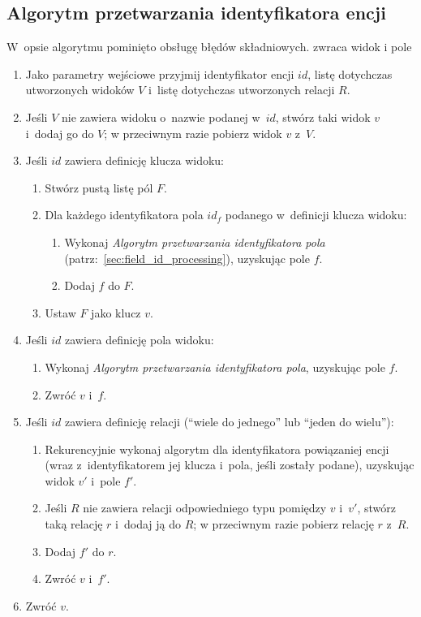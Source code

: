 \subsection{Algorytm przetwarzania identyfikatora encji} \label{sec:entity_id_processing}

W~opsie algorytmu pominięto obsługę błędów składniowych.
zwraca widok i pole

\begin{enumerate}
 \item Jako parametry wejściowe przyjmij identyfikator encji $id$, listę dotychczas utworzonych widoków $V$ i~listę dotychczas utworzonych relacji $R$.
 \item Jeśli $V$ nie zawiera widoku o~nazwie podanej w~$id$, stwórz taki widok $v$ i~dodaj go do $V$; w przeciwnym razie pobierz widok $v$ z~$V$.
 \item Jeśli $id$ zawiera definicję klucza widoku:
  \begin{enumerate}
   \item Stwórz pustą listę pól $F$.
   \item Dla każdego identyfikatora pola $id_f$ podanego w~definicji klucza widoku:
    \begin{enumerate}
     \item Wykonaj \emph{Algorytm przetwarzania identyfikatora pola} (patrz:~\ref{sec:field_id_processing}), uzyskując pole $f$.
     \item Dodaj $f$ do $F$.
    \end{enumerate}
   \item Ustaw $F$ jako klucz $v$.
  \end{enumerate}
 \item Jeśli $id$ zawiera definicję pola widoku:
  \begin{enumerate}
   \item Wykonaj \emph{Algorytm przetwarzania identyfikatora pola}, uzyskując pole $f$.
   \item Zwróć $v$ i~$f$.
  \end{enumerate}
 \item Jeśli $id$ zawiera definicję relacji (``wiele do jednego'' lub ``jeden do wielu''):
  \begin{enumerate}
   \item Rekurencyjnie wykonaj algorytm dla identyfikatora powiązaniej encji (wraz z~identyfikatorem jej klucza i~pola, jeśli zostały podane), uzyskując widok $v'$ i~pole $f'$.
   \item Jeśli $R$ nie zawiera relacji odpowiedniego typu pomiędzy $v$ i~$v'$, stwórz taką relację $r$ i~dodaj ją do $R$; w przeciwnym razie pobierz relację $r$ z~$R$.
   \item Dodaj $f'$ do $r$.
   \item Zwróć $v$ i~$f'$.
  \end{enumerate}
 \item Zwróć $v$.
\end{enumerate}


